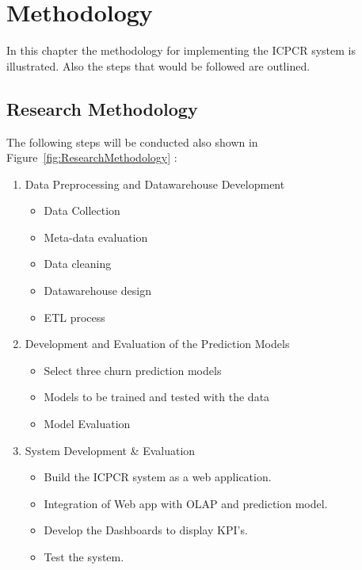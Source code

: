 \setlength{\footskip}{8mm}

\chapter{Methodology}
\label{ch:methodology}

 In this chapter the methodology for implementing the ICPCR system is illustrated. Also the steps that would be followed are outlined.

\section{Research Methodology}
The following steps will be conducted also shown in Figure~\ref{fig:ResearchMethodology} :
\begin{enumerate}[label=Step \arabic*:]
	
	\item Data Preprocessing and Datawarehouse Development
	\begin{itemize}
		\item Data Collection
		\item Meta-data evaluation
		\item Data cleaning
		\item Datawarehouse design
		\item ETL process
	\end{itemize}
	\item Development and Evaluation of the Prediction Models
	\begin{itemize}
		\item Select three churn prediction models
		\item Models to be trained and tested with the data
		\item Model Evaluation
	\end{itemize}
	\item System Development \& Evaluation
	\begin{itemize}
		\item Build the ICPCR system as a web application.
		\item Integration of Web app with OLAP and prediction model.
		\item Develop the Dashboards to display KPI's.
		\item Test the system.
	\end{itemize}
\end{enumerate}

